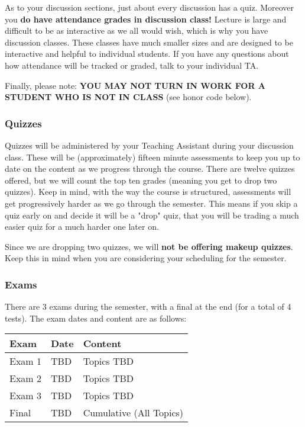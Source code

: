 \documentclass{ximeraXloud}
\begin{document}
    As to your discussion sections, just about every discussion has a quiz. Moreover you \textbf{do have attendance grades in discussion class!} Lecture is large and difficult to be as interactive as we all would wish, which is why you have discussion classes. These classes have much smaller sizes and are designed to be interactive and helpful to individual students. If you have any questions about how attendance will be tracked or graded, talk to your individual TA.
    
    Finally, please note: \textbf{YOU  MAY  NOT  TURN  IN  WORK  FOR  A  STUDENT  WHO  IS NOT  IN  CLASS} (see  honor code below).

\subsubsection*{Quizzes}
    Quizzes will be administered by your Teaching Assistant during your discussion class. These will be (approximately) fifteen minute assessments to keep you up to date on the content as we progress through the course. There are twelve quizzes offered, but we will count the top ten grades (meaning you get to drop two quizzes). Keep in mind, with the way the course is structured, assessments will get progressively harder as we go through the semester. This means if you skip a quiz early on and decide it will be a "drop" quiz, that you will be trading a much easier quiz for a much harder one later on.
    
    Since we are dropping two quizzes, we will \textbf{not be offering makeup quizzes}. Keep this in mind when you are considering your scheduling for the semester. 

\subsubsection*{Exams}
    There are 3 exams during the semester, with a final at the end (for a total of 4 tests). The exam dates and content are as follows:
    \begin{center}
    \begin{tabular}{ |l l l| }
    \hline
    \textbf{Exam}       & \textbf{Date}     & \textbf{Content}\\ \hline 
    Exam 1              & TBD     & Topics TBD\\
    Exam 2              & TBD        & Topics TBD\\
    Exam 3              & TBD        & Topics TBD\\
    Final               & TBD        & Cumulative (All Topics)\\ \hline
    \end{tabular}
    \end{center}
    
\end{document}

